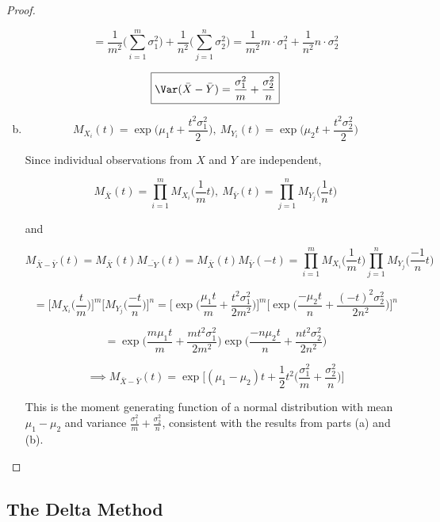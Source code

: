 \begin{proof}
\begin{enumerate}[a.]
\[
= \frac{1}{m^2 }\bigg(\sum_{i=1}^m \sigma_1^2 \bigg) + \frac{1}{n^2} \bigg(  \sum_{j=1}^n \sigma_2^2 \bigg) = \frac{1}{m^2}m \cdot \sigma_1^2 + \frac{1}{n^2} n \cdot \sigma_2^2
\]

\[
\boxed{
\Var (\bar{X} - \bar{Y}) = \frac{\sigma_1^2}{m} + \frac{\sigma_2^2}{n} }
\]

\item

\[
M_{X_i}(t) = \exp\bigg(\mu_1 t + \frac{t^2 \sigma_1^2}{2} \bigg), \ M_{Y_i}(t) = \exp\bigg(\mu_2 t + \frac{t^2 \sigma_2^2}{2} \bigg)
\]

Since individual observations from \(X\) and \(Y\) are independent,

\[
M_{\bar{X}}(t) = \prod_{i=1}^m M_{X_i}\bigg(\frac{1}{m}t\bigg), \ M_{\bar{Y}}(t) = \prod_{j=1}^n M_{Y_j}\bigg(\frac{1}{n}t\bigg)
\]

and

\[
M_{\bar{X} - \bar{Y}}(t) = M_{\bar{X}}(t) M_{\bar{-Y}}(t) = M_{\bar{X}}(t) M_{\bar{Y}}(-t) = \prod_{i=1}^m M_{X_i}\bigg(\frac{1}{m}t\bigg) \prod_{j=1}^n M_{Y_j}\bigg(\frac{-1}{n}t\bigg)
\]

\[
= \bigg[ M_{X_i}\bigg(\frac{t}{m} \bigg) \bigg] ^m  \bigg[ M_{Y_j}\bigg( \frac{-t}{n} \bigg)  \bigg]^n = \bigg[ \exp\bigg(\frac{\mu_1 t}{m} + \frac{t^2 \sigma_1^2}{2m^2} \bigg) \bigg] ^m  \bigg[ \exp\bigg(\frac{-\mu_2 t}{n} + \frac{(-t)^2 \sigma_2^2}{2n^2} \bigg) \bigg]^n
\]

\[
= \exp\bigg(\frac{m \mu_1 t}{m} + \frac{m t^2 \sigma_1^2}{2m^2} \bigg)   \exp\bigg(\frac{-n \mu_2 t}{n} + \frac{n t^2 \sigma_2^2}{2n^2} \bigg)
\]

\[
\implies \boxed{
M_{\bar{X} - \bar{Y}}(t) = \exp \bigg[ (\mu_1 - \mu_2)t + \frac{1}{2}t^2 \bigg( \frac{\sigma_1^2}{m}  + \frac{\sigma_2^2}{n} \bigg) \bigg]}
\]

This is the moment generating function of a normal distribution with mean \( \mu_1 - \mu_2\) and variance \(\frac{\sigma_1^2}{m}  + \frac{\sigma_2^2}{n}\), consistent with the results from parts (a) and (b).



\end{enumerate}

\end{proof}

\subsection{The Delta Method}

